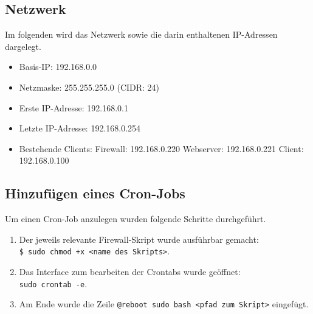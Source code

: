 \documentclass[
    a4paper,
    pagesize,
	pdftex,
    12pt,
]{scrartcl}
\begin{document}
\subsection{Netzwerk}
Im folgenden wird das Netzwerk sowie die darin enthaltenen IP-Adressen dargelegt.
\begin{itemize}
	\item Basis-IP: 192.168.0.0
	\item Netzmaske: 255.255.255.0 (CIDR: 24)
	\item Erste IP-Adresse: 192.168.0.1
	\item Letzte IP-Adresse: 192.168.0.254
	\item Bestehende Clients:
		\subitem Firewall: 192.168.0.220
		\subitem Webserver: 192.168.0.221
		\subitem Client: 192.168.0.100
\end{itemize}

\subsection{Hinzufügen eines Cron-Jobs}\label{cron-job}
Um einen Cron-Job anzulegen wurden folgende Schritte durchgeführt.
\begin{enumerate}
	\item Der jeweils relevante Firewall-Skript wurde ausführbar gemacht: \\ \lstinline[breaklines]|$ sudo chmod +x <name des Skripts>|.
	\item Das Interface zum bearbeiten der Crontabs wurde geöffnet: \\ \lstinline[breaklines]|sudo crontab -e|.
	\item Am Ende wurde die Zeile \lstinline[breaklines]|@reboot sudo bash <pfad zum Skript>| eingefügt.
\end{enumerate}
\end{document}
